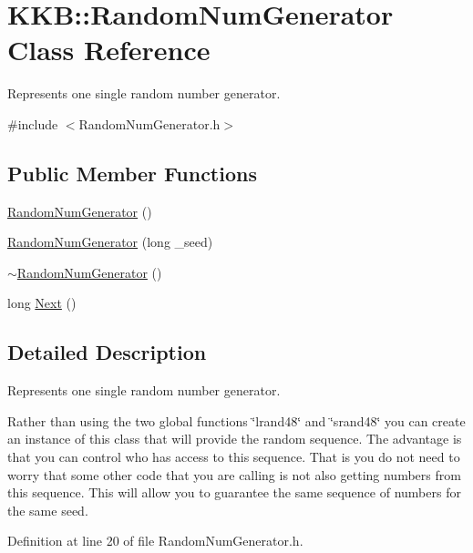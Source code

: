 \hypertarget{class_k_k_b_1_1_random_num_generator}{}\section{K\+KB\+:\+:Random\+Num\+Generator Class Reference}
\label{class_k_k_b_1_1_random_num_generator}


Represents one single random number generator.  




{\ttfamily \#include $<$Random\+Num\+Generator.\+h$>$}

\subsection*{Public Member Functions}
\begin{DoxyCompactItemize}
\item 
\hyperlink{class_k_k_b_1_1_random_num_generator_a7c17e42b6512c279b6301bd8e4d8f5c5}{Random\+Num\+Generator} ()
\item 
\hyperlink{class_k_k_b_1_1_random_num_generator_afd97066c4ad6a91c3e72edd31866e650}{Random\+Num\+Generator} (long \+\_\+seed)
\item 
\hyperlink{class_k_k_b_1_1_random_num_generator_a71ddf586846ca9349b2a916177fc8ac9}{$\sim$\+Random\+Num\+Generator} ()
\item 
long \hyperlink{class_k_k_b_1_1_random_num_generator_a4d89c40b50259c9928605ac8adcc777d}{Next} ()
\end{DoxyCompactItemize}


\subsection{Detailed Description}
Represents one single random number generator. 

Rather than using the two global functions \char`\"{}lrand48\char`\"{} and \char`\"{}srand48\char`\"{} you can create an instance of this class that will provide the random sequence. The advantage is that you can control who has access to this sequence. That is you do not need to worry that some other code that you are calling is not also getting numbers from this sequence. This will allow you to guarantee the same sequence of numbers for the same seed. 

Definition at line 20 of file Random\+Num\+Generator.\+h.



